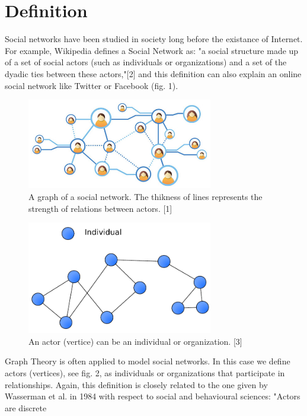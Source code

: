 \documentclass[conference,letterpaper]{IEEEtran}
\begin{document}
\section{Definition}
\indent
Social networks have been studied in society long before the existance of Internet. For example, Wikipedia defines a Social Network
as: "a social structure made up of a set of social actors (such as individuals or organizations) and a set of the dyadic ties 
between these actors,"[2] and this definition can also explain an online social network like Twitter or Facebook (fig. 1).\\
\begin{center}
\begin{figure}[H]
\centering
\includegraphics[width=3.2in]{social-network-grid}
\caption{
A graph of a social network. The thikness of lines represents the strength of relations between actors. [1]
}
\label{fig_sim1}
\end{figure}
\end{center}
\begin{center}
\begin{figure}[hb]
\centering
\includegraphics[width=3.2in]{social-network}
\caption{
An actor (vertice) can be an individual or organization. [3]
}
\label{fig_sim2}
\end{figure}
\end{center}
Graph Theory is often applied to model social networks. In this case we define actors (vertices), see fig. 2,  
as individuals or organizations that participate in relationships. Again, this definition is closely related 
to the one given by Wasserman et al. in 1984 with respect to social and behavioural sciences: "Actors are discrete 
\end{document}
